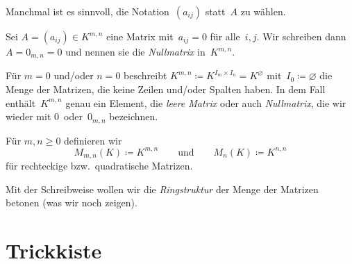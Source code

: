 \documentclass[a4paper]{article}
\begin{document}
Manchmal ist es sinnvoll, die Notation~$(a_{ij})$ statt~$A$ zu wählen.

\begin{definition}[Nullmatrix]
    Sei $A = (a_{ij}) \in K^{m,n}$ eine Matrix mit~$a_{ij} = 0$ für alle~$i,j$. Wir schreiben dann $A = 0_{m,n} = 0$ und nennen sie die \emph{Nullmatrix} in~$K^{m,n}$.

    Für $m = 0$ und/oder $n = 0$ beschreibt $K^{m,n} \coloneqq K^{I_m\times I_n} = K^\varnothing$ mit~$I_0 \coloneqq \varnothing$ die Menge der Matrizen, die keine Zeilen und/oder Spalten haben. In dem Fall enthält~$K^{m,n}$ genau ein Element, die \emph{leere Matrix} oder auch \emph{Nullmatrix}, die wir wieder mit $0$~oder~$0_{m,n}$ bezeichnen.
\end{definition}

\begin{notation}
    Für $m,n \geq 0$ definieren wir
    \begin{equation*}
        M_{m,n}(K) \coloneqq K^{m,n} \qquad\text{und}\qquad M_n(K) \coloneqq K^{n,n}
    \end{equation*}
    für rechteckige bzw.\ quadratische Matrizen.
\end{notation}

Mit der Schreibweise wollen wir die \emph{Ringstruktur} der Menge der Matrizen betonen (was wir noch zeigen).



\newpage\appendix

\section{Trickkiste}
\end{document}
